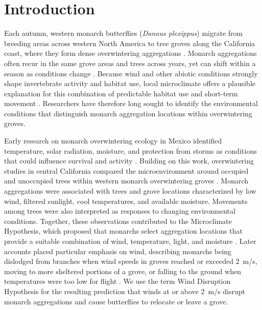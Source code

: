 \documentclass[insects,article,submit,pdftex,moreauthors]{Definitions/mdpi}
\begin{document}
\section{Introduction}

Each autumn, western monarch butterflies (\textit{Danaus plexippus}) migrate from breeding areas across western North America to tree groves along the California coast, where they form dense overwintering aggregations \cite{reppertDemystifyingMonarchButterfly2018,Urquhart1978Autumnal,browerUnderstandingMisunderstandingMigration1995}. Monarch aggregations often recur in the same grove areas and trees across years, yet can shift within a season as conditions change \cite{leongUseMultivariateAnalyses1991,ibsenDensityDependenceHabitat2026}. Because wind and other abiotic conditions strongly shape invertebrate activity and habitat use, local microclimate offers a plausible explanation for this combination of predictable habitat use and short-term movement \cite{sextonEvolutionEcologySpecies2009,louthanWhereWhenSpecies2015,bellSearchAnemotacticOrientation1979,bidlingmayerEffectWindVelocity1995,bonteHeritabilitySpiderBallooning2007,leonardExposureWindAlters2016}. Researchers have therefore long sought to identify the environmental conditions that distinguish monarch aggregation locations within overwintering groves.

Early research on monarch overwintering ecology in Mexico identified temperature, solar radiation, moisture, and protection from storms as conditions that could influence survival and activity \cite{mastersMonarchButterflyDanaus1988,calvertEffectRainSnow1983,andersonFreezeprotectionOverwinteringMonarch1996}. Building on this work, overwintering studies in central California compared the microenvironment around occupied and unoccupied trees within western monarch overwintering groves \cite{leongMicroenvironmentalFactorsAssociated1990,leongUseMultivariateAnalyses1991}. Monarch aggregations were associated with trees and grove locations characterized by low wind, filtered sunlight, cool temperatures, and available moisture. Movements among trees were also interpreted as responses to changing environmental conditions. Together, these observations contributed to the Microclimate Hypothesis, which proposed that monarchs select aggregation locations that provide a suitable combination of wind, temperature, light, and moisture \cite{leongMicroenvironmentalFactorsAssociated1990,leongUseMultivariateAnalyses1991}. Later accounts placed particular emphasis on wind, describing monarchs being dislodged from branches when wind speeds in groves reached or exceeded 2~m/s, moving to more sheltered portions of a grove, or falling to the ground when temperatures were too low for flight \cite{leongRestorationOverwinteringGrove1999,leongEvaluationManagementCalifornia2016}. We use the term Wind Disruption Hypothesis for the resulting prediction that winds at or above 2~m/s disrupt monarch aggregations and cause butterflies to relocate or leave a grove.
\end{document}
